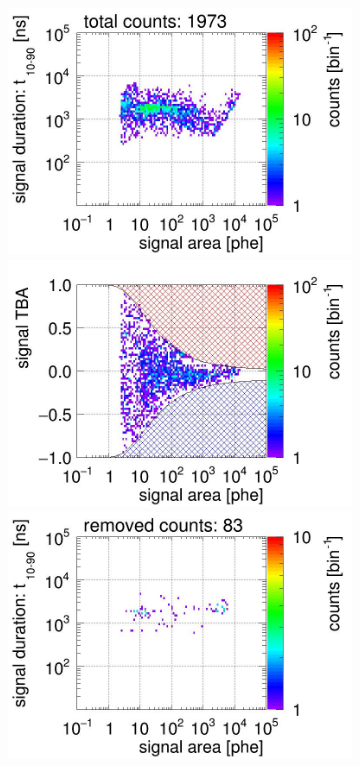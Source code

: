 \begin{landscape}
	\begin{figure}[!p]\ContinuedFloat
	\centering
	\begin{subfigure}[t]{0.33\textwidth} %
		\centering
		\includegraphics[width=\figurewidth,clip,trim={0 98 0 0}]{Figures/GasTest/CutsValid/res64767/pdpa11Vecfig64767.jpg}
		\includegraphics[width=\figurewidth,clip,trim={0 98 0 40}]{Figures/GasTest/CutsValid/res64767/tbapa11Vecfig64767.jpg}
		\includegraphics[width=\figurewidth,clip,trim={0 98 0 10}]{Figures/GasTest/CutsValid/res64767/pdpaX11Vecfig64767.jpg}

\end{subfigure}
\end{figure}
\end{landscape}
